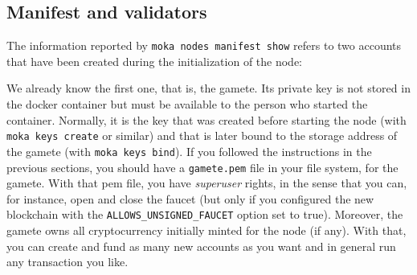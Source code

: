\subsection{Manifest and validators}\label{subsec:manifest_and_validators}

The information reported by \texttt{moka nodes manifest show} refers to two accounts that have been
created during the initialization of the node:
%
\begin{shellbox}\end{shellbox}
%
We already know the first one, that is, the gamete.
Its private key is not stored in the docker container
but must be available to the person who started the container.
Normally, it is the key that was created before starting the node (with \texttt{moka keys create}
or similar) and
that is later bound to the storage address of the gamete (with \texttt{moka keys bind}). If you
followed the instructions in the previous sections, you should have a
\texttt{gamete.pem} file in your file system, for the gamete. With that pem file,
you have \emph{superuser} rights,
in the sense that you can, for instance,
open and close the faucet (but only if you configured the new blockchain
with the \texttt{ALLOWS\_UNSIGNED\_FAUCET} option set to true).
Moreover, the gamete owns all cryptocurrency initially minted for the node (if any).
With that, you can create and fund as many new accounts
as you want and in general run any transaction you like.

